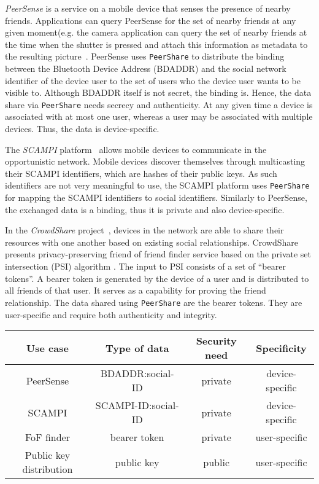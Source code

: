 \documentclass[twocolumn,a4paper,10pt]{article}
\newcommand{\peershare}{\texttt{PeerShare}\xspace}
\begin{document}
\emph{PeerSense} \cite{DBLP:conf/percom/GuptaMNAW12} is a service on a mobile device that senses the presence of nearby friends. Applications can query PeerSense for the set of nearby friends at any given moment(e.g. the camera application can query the set of nearby friends at the time when the shutter is pressed and attach this information as metadata to the resulting picture~\cite{Qin:2011:TSA:1999995.1999997}. PeerSense uses \peershare to distribute the binding between the Bluetooth Device Address (BDADDR) and the social network identifier of the device user to the set of users who the device user wants to be visible to. Although BDADDR itself is not secret, the binding is. Hence, the data share via \peershare needs secrecy and authenticity. At any given time a device is associated with at most one user, whereas a user may be associated with multiple devices. Thus, the data is device-specific.

The \emph{SCAMPI} platform~\cite{DBLP:journals/ccr/PitkanenKOCPGPLTHMHS12} allows mobile devices to communicate in the opportunistic network. Mobile devices discover themselves through multicasting their SCAMPI identifiers, which are hashes of their public keys. As such identifiers are not very meaningful to use, the SCAMPI platform uses \peershare for mapping the SCAMPI identifiers to social identifiers. Similarly to PeerSense, the exchanged data is a binding, thus it is private and also device-specific. 

In the \emph{CrowdShare} project~\cite{CrowdShare-techrep}\cite{acns2013}, devices in the network are able to share their resources with one another based on existing social relationships. CrowdShare presents privacy-preserving friend of friend finder service based on the private set intersection (PSI) algorithm \cite{DGT12}. The input to PSI consists of a set of ``bearer tokens''. A bearer token is generated by the device of a user and is distributed to all friends of that user. It serves as a capability for proving the friend relationship. The data shared using \peershare are the bearer tokens. They are user-specific and require both authenticity and integrity.

\begin{table*}[ht!]
\caption{Summary of existing \peershare use cases}
\label{usecase_summary}
\centering
\begin{tabular}{ | c | c | c | c | }
\hline
\textbf{Use case} & \textbf{Type of data} & \textbf{Security need} & \textbf{Specificity} \\ \hline
PeerSense & BDADDR:social-ID & private & device-specific \\ \hline
SCAMPI & SCAMPI-ID:social-ID & private & device-specific \\ \hline
FoF finder & bearer token & private & user-specific \\ \hline
Public key distribution & public key & public & user-specific \\ \hline
\end{tabular}
\end{table*}
\end{document}
